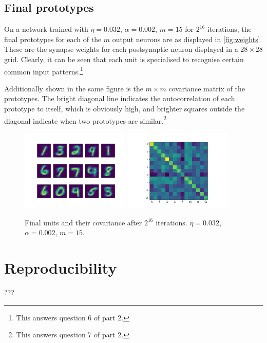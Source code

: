 \documentclass[a4paper, 11pt, twocolumn, final]{article} %
\begin{document}
\subsection{Final prototypes} On a network trained with $\eta = 0.032$, $\alpha =
0.002$, $m = 15$ for $2^{16}$ iterations, the final prototypes for each of the
$m$ output neurons are as displayed in \autoref{fig:weights}.  These are the
synapse weights for each postsynaptic neuron displayed in a $28\times28$ grid.
Clearly, it can be seen that each unit is specialised to recognise certain
common input patterns.\footnote{This answers question 6 of part 2.}

Additionally shown in the same figure is the $m\times{}m$ covariance matrix of
the prototypes. The bright diagonal line indicates the autocorrelation of each
prototype to itself, which is obviously high, and brighter squares outside the
diagonal indicate when two prototypes are similar.\footnote{This answers
question 7 of part 2.}

\begin{figure}
  \includegraphics[width=0.46\textwidth]{weights.png}
  \includegraphics[width=0.46\textwidth]{unit_covariance.png}
  \caption{Final units and their covariance after $2^{16}$ iterations.
           $\eta = 0.032$, $\alpha = 0.002$, $m = 15$.}
  \label{fig:weights}
\end{figure}

\section{Reproducibility}
???
\end{document}

